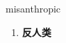 
\begin{frame}
{\huge misanthropic}
\begin{center}
\begin{enumerate}\Large
  \item \textbf{反人类}
\end{enumerate}
\end{center}
\end{frame}
